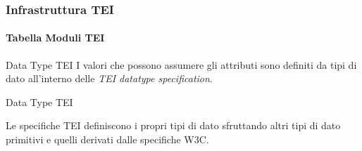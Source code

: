 \begin{frame}
    \frametitle{Infrastruttura TEI}
    \framesubtitle{Tabella Moduli TEI}
    \addtocounter{nframe}{1}
    
    \begin{block}{Data Type TEI}
        I valori che possono assumere gli attributi sono definiti da tipi di dato all'interno delle \textit{TEI datatype specification}.
    \end{block}

    \begin{block}{Data Type TEI}
       
    \end{block}
    Le specifiche TEI definiscono i propri tipi di dato sfruttando altri tipi di dato primitivi e quelli derivati dalle specifiche W3C. 
\end{frame}















